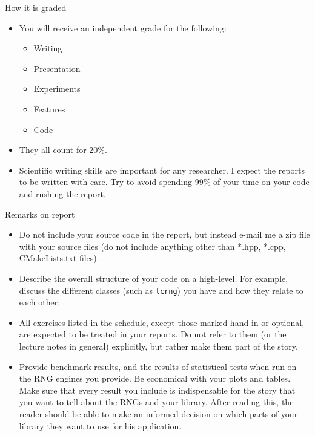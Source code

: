 \documentclass[10pt]{beamer}
\begin{document}
\begin{frame}[label={sec:org71f1632}]{How it is graded}
\begin{itemize}
\item You will receive an independent grade for the following:
\begin{itemize}
\item Writing
\item Presentation
\item Experiments
\item Features
\item Code
\end{itemize}
\item They all count for 20\%.
\item Scientific writing skills are important for any researcher. I expect the
reports to be written with care. Try to avoid spending 99\% of your time on
your code and rushing the report.
\end{itemize}
\end{frame}
\begin{frame}[fragile,label={sec:org7b10331}]{Remarks on report}
 \begin{itemize}
\item Do not include your source code in the report, but instead \alert{e-mail} me a zip
file with your source files (do not include anything other than *.hpp, *.cpp,
CMakeLists.txt files).
\item Describe the overall structure of your code on a \alert{high-level}. For example,
discuss the different classes (such as \texttt{lcrng}) you have and how they relate
to each other.
\item All \alert{exercises} listed in the schedule, except those marked hand-in or optional,
are expected to be treated in your reports. Do not refer to them (or the
lecture notes in general) explicitly, but rather make them part of the story.
\item Provide \alert{benchmark results}, and the results of \alert{statistical tests} when run on
the RNG engines you provide. Be economical with your plots and tables. Make
sure that every result you include is indispensable for the story that you
want to tell about the RNGs and your library. After reading this, the reader
should be able to make an informed decision on which parts of your library they
want to use for his application.
\end{itemize}
\end{frame}
\end{document}
